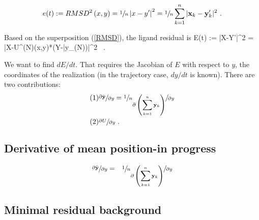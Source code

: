 \documentclass[9pt,lineno]{elife}
\begin{document}
\begin{equation}
\label{RMSD}
e(t) := RMSD^2\left(x,y\right) = \sfrac{1}{n}\left|x-y'\right|^2 = \sfrac{1}{n}\sum_{k=1}^n | {\bf x}_k -
 {\bf y}'_k |^2 \ .
\end{equation}

Based on the superposition (\ref{RMSD}), the ligand residual is
\be%
E(t) := \left|X-Y'\right|^2 = 
\left|X-{\cal U}^{(N)}(x,y)*(Y-{\bar y_{(N)}})\right|^2 \ .
\ee

We want to find $dE/dt$. That requires the Jacobian of $E$ with respect to $y$,
the coordinates of the realization (in the trajectory case, $dy/dt$ is known). 
There are two contributions:
\begin{eqnarray*}
(1) & \sfrac{\partial \bar{\bf y}}{\partial y} = 
\sfrac{1}{n} \sfrac{\partial \left(\sum_{k=1}^n {\bf y}_k\right)}{\partial y}  \\
(2) & \sfrac{\partial U}{\partial y} \ .
\end{eqnarray*}

\subsection{Derivative of mean position-in progress}
\begin{eqnarray*}
\sfrac{\partial \bar{\bf y}}{\partial y}& = & 
\sfrac{1}{n} \sfrac{\partial \left(\sum_{k=1}^n {\bf y}_k\right)}{\partial y}  \\
\end{eqnarray*}
\subsection{Minimal residual background}
\end{document}
